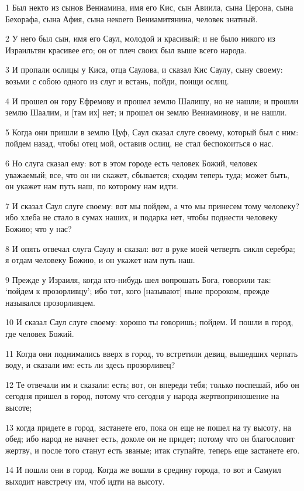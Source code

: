 \par 1 Был некто из сынов Вениамина, имя его Кис, сын Авиила, сына Церона, сына Бехорафа, сына Афия, сына некоего Вениамитянина, человек знатный.
\par 2 У него был сын, имя его Саул, молодой и красивый; и не было никого из Израильтян красивее его; он от плеч своих был выше всего народа.
\par 3 И пропали ослицы у Киса, отца Саулова, и сказал Кис Саулу, сыну своему: возьми с собою одного из слуг и встань, пойди, поищи ослиц.
\par 4 И прошел он гору Ефремову и прошел землю Шалишу, но не нашли; и прошли землю Шаалим, и [там их] нет; и прошел он землю Вениаминову, и не нашли.
\par 5 Когда они пришли в землю Цуф, Саул сказал слуге своему, который был с ним: пойдем назад, чтобы отец мой, оставив ослиц, не стал беспокоиться о нас.
\par 6 Но слуга сказал ему: вот в этом городе есть человек Божий, человек уважаемый; все, что он ни скажет, сбывается; сходим теперь туда; может быть, он укажет нам путь наш, по которому нам идти.
\par 7 И сказал Саул слуге своему: вот мы пойдем, а что мы принесем тому человеку? ибо хлеба не стало в сумах наших, и подарка нет, чтобы поднести человеку Божию; что у нас?
\par 8 И опять отвечал слуга Саулу и сказал: вот в руке моей четверть сикля серебра; я отдам человеку Божию, и он укажет нам путь наш.
\par 9 Прежде у Израиля, когда кто-нибудь шел вопрошать Бога, говорили так: `пойдем к прозорливцу'; ибо тот, кого [называют] ныне пророком, прежде назывался прозорливцем.
\par 10 И сказал Саул слуге своему: хорошо ты говоришь; пойдем. И пошли в город, где человек Божий.
\par 11 Когда они поднимались вверх в город, то встретили девиц, вышедших черпать воду, и сказали им: есть ли здесь прозорливец?
\par 12 Те отвечали им и сказали: есть; вот, он впереди тебя; только поспешай, ибо он сегодня пришел в город, потому что сегодня у народа жертвоприношение на высоте;
\par 13 когда придете в город, застанете его, пока он еще не пошел на ту высоту, на обед; ибо народ не начнет есть, доколе он не придет; потому что он благословит жертву, и после того станут есть званые; итак ступайте, теперь еще застанете его.
\par 14 И пошли они в город. Когда же вошли в средину города, то вот и Самуил выходит навстречу им, чтоб идти на высоту.
